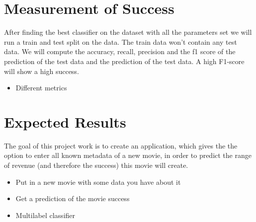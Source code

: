 \section{Measurement of Success}
After finding the best classifier on the dataset with all the parameters set we will run a train and test split on the data. The train data won't contain any test data. We will compute the accuracy, recall, precision and the f1 score of the prediction of the test data and the prediction of the test data. A high F1-score will show a high success.
\begin{itemize}
	\item Different metrics
\end{itemize}


\section{Expected Results}
The goal of this project work is to create an application, which gives the the option to enter all known metadata of a new movie, in order to predict the range of revenue (and therefore the success) this movie will create.
\begin{itemize}
	\item Put in a new movie with some data you have about it
	\item Get a prediction of the movie success
	\item Multilabel classifier

\end{itemize}




